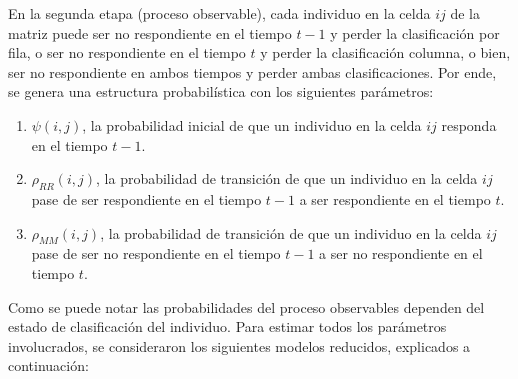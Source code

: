 \documentclass[
  12pt,
]{book}
\providecommand{\tightlist}{%
  \setlength{\itemsep}{0pt}\setlength{\parskip}{0pt}}
\begin{document}
En la segunda etapa (proceso observable), cada individuo en la celda \(ij\) de la matriz puede ser no respondiente en el tiempo \(t-1\) y perder la clasificación por fila, o ser no respondiente en el tiempo \(t\) y perder la clasificación columna, o bien, ser no respondiente en ambos tiempos y perder ambas clasificaciones. Por ende, se genera una estructura probabilística con los siguientes parámetros:

\begin{enumerate}
\def\labelenumi{\arabic{enumi}.}
\tightlist
\item
  \(\psi(i,j)\), la probabilidad inicial de que un individuo en la celda \(ij\) responda en el tiempo \(t-1\).
\item
  \(\rho_{RR}(i,j)\), la probabilidad de transición de que un individuo en la celda \(ij\) pase de ser respondiente en el tiempo \(t-1\) a ser respondiente en el tiempo \(t\).
\item
  \(\rho_{MM}(i,j)\), la probabilidad de transición de que un individuo en la celda \(ij\) pase de ser no respondiente en el tiempo \(t-1\) a ser no respondiente en el tiempo \(t\).
\end{enumerate}

Como se puede notar las probabilidades del proceso observables dependen del estado de clasificación del individuo. Para estimar todos los parámetros involucrados, se consideraron los siguientes modelos reducidos, explicados a continuación:
\end{document}
